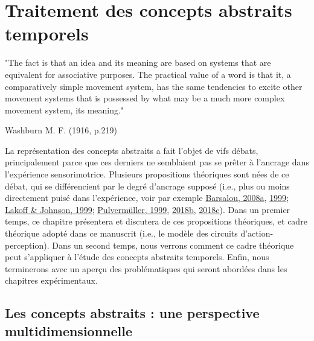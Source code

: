 \documentclass[
  a4paper,12pt,twoside,onecolumn,openright,final,oldfontcommands]{memoir}
\newcommand\chaptercolor{gray}
\newcommand{\changechaptercolor}[1]{
  \renewcommand\chaptercolor{#1}
}
\newcommand{\initial}[1]{
	\lettrine[lines=3,lhang=0.33,nindent=0em]{
		\color{gray}
     		{\textsc{#1}}}{}}
\begin{document}
\changechaptercolor{hokusai2}

\hypertarget{chap2}{%
\chapter{Traitement des concepts abstraits temporels}\label{chap2}}

\epigraph{"The fact is that an idea and its meaning are based on systems that are equivalent for associative purposes. The practical value of a word is that it, a comparatively simple movement system, has the same tendencies to excite other movement systems that is possessed by what may be a much more complex movement system, its meaning."}{Washburn M. F. (1916, p.219)}

\initial{L}a représentation des concepts abstraits a fait l'objet de vifs débats, principalement parce que ces derniers ne semblaient pas se prêter à l'ancrage dans l'expérience sensorimotrice. Plusieurs propositions théoriques sont nées de ce débat, qui se différencient par le degré d'ancrage supposé (i.e., plus ou moins directement puisé dans l'expérience, voir par exemple \protect\hyperlink{ref-barsalou_grounded_2008}{Barsalou, 2008a}, \protect\hyperlink{ref-barsalou_perceptual_1999}{1999}; \protect\hyperlink{ref-lakoff_philosophy_1999}{Lakoff \& Johnson, 1999}; \protect\hyperlink{ref-pulvermuller_words_1999}{Pulvermüller, 1999}, \protect\hyperlink{ref-pulvermuller_neurobiological_2018}{2018b}, \protect\hyperlink{ref-pulvermuller_case_2018}{2018c}). Dans un premier temps, ce chapitre présentera et discutera de ces propositions théoriques, et cadre théorique adopté dans ce manuscrit (i.e., le modèle des circuits d'action-perception). Dans un second temps, nous verrons comment ce cadre théorique peut s'appliquer à l'étude des concepts abstraits temporels. Enfin, nous terminerons avec un aperçu des problématiques qui seront abordées dans les chapitres expérimentaux.

\hypertarget{defa}{%
\section{Les concepts abstraits : une perspective multidimensionnelle}\label{defa}}
\end{document}
